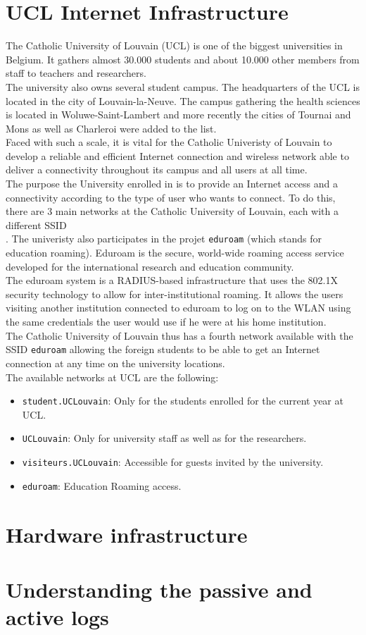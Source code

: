 \section{UCL Internet Infrastructure}
The Catholic University of Louvain (UCL) is one of the biggest universities in Belgium. It gathers almost 30.000 students and about 10.000 other members from staff to teachers and researchers.\\
The university also owns several student campus. The headquarters of the UCL is located in the city of Louvain-la-Neuve. The campus gathering the health sciences is located in Woluwe-Saint-Lambert and more recently the cities of Tournai and Mons as well as Charleroi were added to the list.\\
Faced with such a scale, it is vital for the Catholic Univeristy of Louvain to develop a reliable and efficient Internet connection and wireless network able to deliver a connectivity throughout its campus and all users at all time.\\
The purpose the University enrolled in is to provide an Internet access and a connectivity according to the type of user who wants to connect. To do this, there are 3 main networks at the Catholic University of Louvain, each with a different SSID\\.
The univeristy also participates in the projet \texttt{eduroam} (which stands for education roaming). Eduroam is the secure, world-wide roaming access service developed for the international research and education community\cite{eduroam1}.\\
The eduroam system is a RADIUS-based infrastructure that uses the 802.1X security technology to allow for inter-institutional roaming. It allows the users visiting another institution connected to eduroam to log on to the WLAN using the same credentials the user would use if he were at his home institution\cite{eduroam2}.\\
The Catholic University of Louvain thus has a fourth network available with the SSID \texttt{eduroam} allowing the foreign students to be able to get an Internet connection at any time on the university locations.\\
The available networks at UCL are the following:
\begin{itemize}
	\item \texttt{student.UCLouvain}: Only for the students enrolled for the current year at UCL.
	\item \texttt{UCLouvain}: Only for university staff as well as for the researchers.
	\item \texttt{visiteurs.UCLouvain}: Accessible for guests invited by the university.
	\item \texttt{eduroam}: Education Roaming access.
\end{itemize}



\section{Hardware infrastructure}


\section{Understanding the passive and active logs}